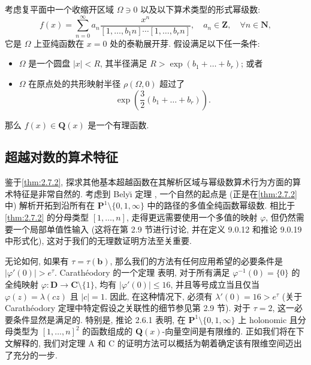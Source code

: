 \begin{theorem}\label{thm:2.7.10}
考虑复平面中一个收缩开区域 \(\Omega \ni 0\) 以及以下算术类型的形式幂级数:
\begin{equation}\label{eq:2.7.11}
f(x) = \sum_{n=0}^{\infty} a_n \frac{x^n}{[1, \dots, b_1 n] \cdots [1, \dots, b_r n]}, \quad a_n \in \mathbf{Z}, \quad \forall n \in \mathbf{N},
\end{equation}
它是 \(\Omega\) 上亚纯函数在 \(x=0\) 处的泰勒展开芽. 假设满足以下任一条件:
\begin{itemize}
  \item[(i)] \(\Omega\) 是一个圆盘 \(|x| < R\), 其半径满足 \(R > \exp(b_1 + \dots + b_r)\); 或者
  \item[(ii)] \(\Omega\) 在原点处的共形映射半径 \(\rho(\Omega, 0)\) 超过了
    \[ \exp\left(\frac{3}{2}(b_1+\ldots+b_r)\right). \]
\end{itemize}
那么 \(f(x) \in \mathbf{Q}(x)\) 是一个有理函数.
\end{theorem}



\subsection{超越对数的算术特征}\label{sec:2.8}

鉴于\autoref{thm:2.7.2}, 探求其他基本超越函数在其解析区域与幂级数算术行为方面的算术特征是非常自然的. 考虑到 Bely\u{\i} 定理 \cite{BG06}, 一个自然的起点是 (正是在\autoref{thm:2.7.2} 中) 解析开拓到沿所有在 $\mathbf{P}^1 \setminus \{0,1,\infty\}$ 中的路径的多值全纯函数幂级数. 相比于\autoref{thm:2.7.2} 的分母类型 \([1,\dots,n]\), 走得更远需要使用一个多值的映射 \(\varphi\), 但仍然需要一个局部单值性输入 (这将在第 2.9 节进行讨论, 并在定义 9.0.12 和推论 9.0.19 中形式化), 这对于我们的无理数证明方法至关重要.

无论如何, 如果有 \(\tau = \tau(\mathbf{b})\), 那么我们的方法有任何应用希望的必要条件是 \(\lvert\varphi'(0)\rvert > e^{\tau}\). Carath{\'e}odory 的一个定理 \cite[p.~198, (412.8)]{Car54} 表明, 对于所有满足 \(\varphi^{-1}(0) = \{0\}\) 的全纯映射 \(\varphi: \mathbf{D} \to \mathbf{C} \setminus \{1\}\), 均有 \(\lvert\varphi'(0)\rvert \le 16\), 并且等号成立当且仅当 \(\varphi(z) = \lambda(cz)\) 且 \(\lvert c\rvert = 1\). 因此, 在这种情况下, 必须有 \(\lambda'(0) = 16 > e^{\tau}\) (关于 Carath{\'e}odory 定理中特定假设之关联性的细节参见第 2.9 节). 对于 \(\tau = 2\), 这一必要条件显然是满足的. 特别是, 推论 2.6.1 表明, 在 \(\mathbf{P}^1 \setminus \{0, 1, \infty\}\) 上 holonomic 且分母类型为 \([1, \dots, n]^2\) 的函数组成的 \(\mathbf{Q}(x)\)-向量空间是有限维的. 正如我们将在下文解释的, 我们对定理 A 和 C 的证明方法可以概括为朝着确定该有限维空间迈出了充分的一步.

